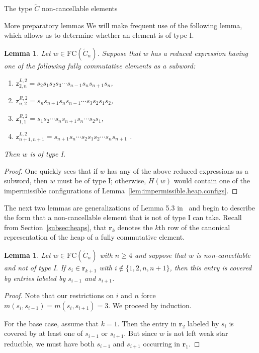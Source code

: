 \documentclass[12pt]{amsart}
\newtheorem{lem}[thm]{Lemma}
\newcommand{\C}{\widetilde{C}}
\newcommand{\z}{\mathsf{z}}
\renewcommand{\(}{\left(}
\renewcommand{\)}{\right)}
\newcommand{\FC}{\mathrm{FC}}
\renewcommand{\r}{\mathbf{r}}
\begin{document}
\begin{section}{The type $\C$ non-cancellable elements}
\begin{subsection}{More preparatory lemmas}
We will make frequent use of the following lemma, which allows us to determine whether an element is of type I.

\begin{lem}\label{lem:zigzag}
Let $w \in \FC(\C_{n})$.  Suppose that $w$ has a reduced expression having one of the following fully commutative elements as a subword:  
\begin{enumerate}[label=\rm{(\roman*)}]
\item $\z^{L,2}_{2,n}=s_{2}s_{1}s_{2}s_{3} \cdots s_{n-1}s_{n}s_{n+1}s_{n}$,
\item $\z^{R,2}_{n,2}=s_{n}s_{n+1}s_{n}s_{n-1}\cdots s_{3}s_{2}s_{1}s_{2}$,
\item $\z^{R,2}_{1,1}=s_{1}s_{2}\cdots s_{n}s_{n+1}s_{n}\cdots s_{2}s_{1}$,
\item $\z^{L,2}_{n+1,n+1}=s_{n+1}s_{n}\cdots s_{2}s_{1}s_{2}\cdots s_{n}s_{n+1}$ .
\end{enumerate}
Then $w$ is of type I.
\end{lem}

\begin{proof}
One quickly sees that if $w$ has any of the above reduced expressions as a subword, then $w$ must be of type I; otherwise, $H(w)$ would contain one of the impermissible configurations of Lemma~\ref{lem:impermissible.heap.configs}.
\end{proof}

The next two lemmas are generalizations of Lemma 5.3 in~\cite{Green.R:P} and begin to describe the form that a non-cancellable element that is not of type I can take.  Recall from Section~\ref{subsec:heaps}, that $\r_k$ denotes the $k$th row of the canonical representation of the heap of a fully commutative element.

\begin{lem}\label{lem:weak.star.middle}
Let $w \in \FC(\C_{n})$ with $n \geq 4$ and suppose that $w$ is non-cancellable and not of type I.  If $s_{i} \in \r_{k+1}$ with $i \notin \{1,2,n,n+1\}$, then this entry is covered by entries labeled by $s_{i-1}$ and $s_{i+1}$.
\end{lem}

\begin{proof}
Note that our restrictions on $i$ and $n$ force $m(s_{i}, s_{i-1})=m(s_{i}, s_{i+1})=3$.  We proceed by induction.  

For the base case, assume that $k=1$.  Then the entry in $\r_2$ labeled by $s_i$ is covered by at least one of $s_{i-1}$ or $s_{i+1}$.   But since $w$ is not left weak star reducible, we must have both $s_{i-1}$ and $s_{i+1}$ occurring in $\r_{1}$.


\end{proof}
\end{subsection}
\end{section}
\end{document}
